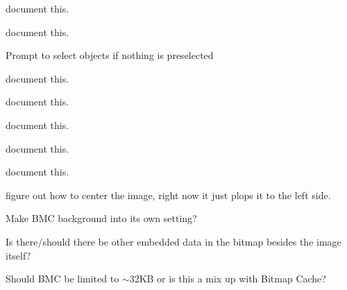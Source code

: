 \begin{DoxyRefList}
%
document this.  
\item[Member \mbox{\hyperlink{imgui__main_8c_af79e738d67fcf5da0a50d6ea559d3b32}{RGB\+\_\+\+MODE\+\_\+\+BACKGROUND}} ]\label{todo__todo000217}%
%
document this.  
\item[Member \mbox{\hyperlink{imgui__main_8c_a644510fd1fda113a92ff678338657074}{rotate\+\_\+main}} (void)]\label{todo__todo000218}%
%
Prompt to select objects if nothing is preselected  
\item[Member \mbox{\hyperlink{imgui__main_8c_a778d491e9851372eed18d56bd73acc47}{rotate\+\_\+selected\+\_\+action}} (void)]\label{todo__todo000161}%
%
document this.  
\item[Member \mbox{\hyperlink{imgui__main_8c_ac616ca8468d7ccf756f08e335454aa44}{rotate\+Action}} (void)]\label{todo__todo000066}%
%
document this.  
\item[Member \mbox{\hyperlink{imgui__main_8c_a6c438df405b6d7180a3e20f42c37e0c9}{rounded\+\_\+rectangle\+\_\+action}} (void)]\label{todo__todo000147}%
%
document this.  
\item[Member \mbox{\hyperlink{imgui__main_8c_aabe2efa6627dbff786aa942b4d28220f}{rubber\+\_\+point\+\_\+action}} (void)]\label{todo__todo000130}%
%
document this.  
\item[Member \mbox{\hyperlink{imgui__main_8c_ae842547a55833564fee3ca58a87e61a7}{rubber\+\_\+text\+\_\+action}} (void)]\label{todo__todo000131}%
%
document this.  
\item[Member \mbox{\hyperlink{imgui__main_8c_ac3e2aeea61a03de723ef16125e9e08ea}{save\+\_\+bmc}} (void)]\label{todo__todo000018}%
%
figure out how to center the image, right now it just plops it to the left side. 

\label{todo__todo000017}%
%
Make BMC background into it\textquotesingle{}s own setting?

\label{todo__todo000016}%
%
Is there/should there be other embedded data in the bitmap besides the image itself?

\label{todo__todo000015}%
%
Should BMC be limited to $\sim$32\+KB or is this a mix up with Bitmap Cache?


\end{DoxyRefList}
